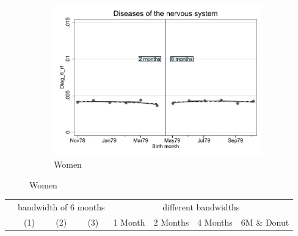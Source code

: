 \documentclass[a4paper ]{article}
\begin{document}
\begin{figure}[h]
\begin{subfigure}[t]{0.31\textwidth}
		\centering
		\includegraphics[width=0.99\textwidth]{R1_RD_Diag_6_rf_fits}
		\caption{Women}
	\end{subfigure}
\end{figure}


\begin{table}[h]\centering
\def\sym#1{\ifmmode^{#1}\else\(^{#1}\)\fi}
\begin{tabular}{l*{3}{c}|cccc}
\toprule
&\multicolumn{3}{c}{bandwidth of 6 months} & \multicolumn{4}{c}{different bandwidths} \\
 \cmidrule(lr{1em}){2-4} \cmidrule(lr{1em}){5-8}
 &\multicolumn{1}{c}{(1)}&\multicolumn{1}{c}{(2)}&\multicolumn{1}{c}{(3)}& 1 Month & 2 Months & 4 Months & 6M \& Donut \\
\midrule 

\bottomrule
\end{tabular}
\end{table}
\end{document}
